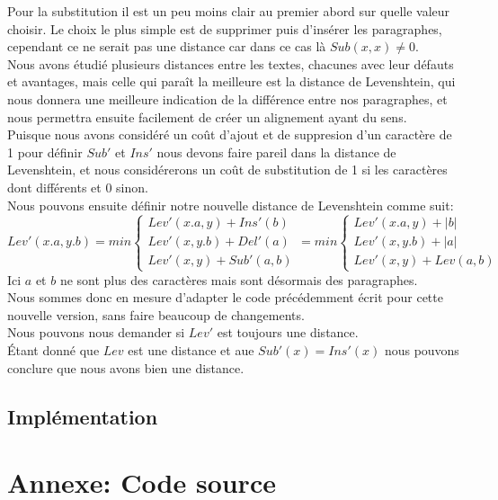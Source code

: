 \documentclass{article}
\begin{document}
Pour la substitution il est un peu moins clair au premier abord sur quelle
valeur choisir. Le choix le plus simple est de supprimer puis d'insérer les
paragraphes, cependant ce ne serait pas une distance car dans ce cas là
$Sub(x,x) \neq 0$.\\
Nous avons étudié plusieurs distances entre les textes, chacunes avec leur
défauts et avantages, mais celle qui paraît la meilleure est la distance de
Levenshtein, qui nous donnera une meilleure indication de la différence entre
nos paragraphes, et nous permettra ensuite facilement de créer un alignement
ayant du sens.\\
Puisque nous avons considéré un coût d'ajout et de suppresion d'un caractère de
1 pour définir $Sub'$ et $Ins'$ nous devons faire pareil dans la distance de
Levenshtein, et nous considérerons un coût de substitution de 1 si les
caractères dont différents et 0 sinon.\\

Nous pouvons ensuite définir notre nouvelle distance de Levenshtein comme suit:
\begin{equation*}
	Lev'(x.a,y.b)= min
		\begin{cases}
			Lev'(x.a,y) + Ins'(b)\\
			Lev'(x,y.b) + Del'(a)\\
			Lev'(x,y) + Sub'(a,b)
		\end{cases}
		= min
		\begin{cases}
			Lev'(x.a,y) + \lvert b \rvert\\
			Lev'(x,y.b) + \lvert a \rvert\\
			Lev'(x,y) + Lev(a,b)
		\end{cases}
\end{equation*}
Ici $a$ et $b$ ne sont plus des caractères mais sont désormais des
paragraphes.\\
Nous sommes donc en mesure d'adapter le code précédemment écrit pour cette
nouvelle version, sans faire beaucoup de changements.\\

Nous pouvons nous demander si $Lev'$ est toujours une distance.\\
Étant donné que $Lev$ est une distance et aue $Sub'(x)=Ins'(x)$ nous pouvons
conclure que nous avons bien une distance.

\subsection{Implémentation}

\section{Annexe: Code source}
		
\end{document}
